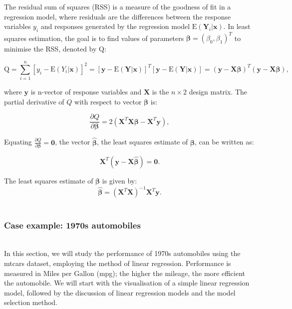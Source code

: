 \documentclass{article}\usepackage[]{graphicx}\usepackage[]{xcolor}
\numberwithin{equation}{section}
\begin{document}
\noindent The residual sum of squares (RSS) is a measure of the goodness of fit in a regression model, where residuals are the differences between the response variables $y_i$ and responses generated by the regression model $\mathrm{E}(\mathbf{Y}_i | \mathbf{x})$. In least squares estimation, the goal is to find values of parameters $\boldsymbol{\beta} = (\beta_0, \beta_1)^T$ to minimise the RSS, denoted by $\mathrm{Q}$: 

\begin{equation}\label{eq:4-3}
\mathrm{Q} = \sum_{i=1}^{n} [y_i - \mathrm{E} (Y_i | \mathbf{x})]^2 
           = [\mathbf{y}- \mathrm{E} (\mathbf{Y} | \mathbf{x})]^{T} [\mathbf{y}- \mathrm{E} (\mathbf{Y} | \mathbf{x})] 
           = (\mathbf{y}- \mathbf{X} \boldsymbol{\beta})^{T} (\mathbf{y}- \mathbf{X} \boldsymbol{\beta}),
\end{equation}

\noindent
where $\mathbf{y}$ is n-vector of response variables and $\mathbf{X}$ is the $n \times 2$ design matrix. The partial derivative of $Q$ with respect to vector $\boldsymbol{\beta}$ is:

\begin{equation}\label{eq:4-4}
\frac{\partial Q}{\partial \boldsymbol{\beta}} = 2(\mathbf{X}^T\mathbf{X} \boldsymbol{\beta} - \mathbf{X}^T\mathbf{y}),
\end{equation}

\noindent
Equating $\frac{\partial Q}{\partial \boldsymbol{\beta}} = \mathbf{0}$, the vector $\hat{\boldsymbol{\beta}}$, the least squares estimate of $\boldsymbol{\beta}$, can be written as:

\begin{equation}\label{eq:4-5}
\mathbf{X}^T(\mathbf{y}-\mathbf{X}\hat{\boldsymbol{\beta}})=\mathbf{0}.
\end{equation}

\noindent 
The least squares estimate of $\boldsymbol{\beta}$ is given by:
\begin{equation}\label{eq:4-6}
\hat{\boldsymbol{\beta}} = (\mathbf{X}^T\mathbf{X})^{-1}\mathbf{X}^T\mathbf{y}.
\end{equation}
\\ 
\noident 
\subsubsection{Case example: 1970s automobiles}\\
\noindent In this section, we will study the performance of 1970s automobiles using the mtcars dataset, employing the method of linear regression. Performance is measured in Miles per Gallon (mpg); the higher the mileage, the more efficient the automobile. We will start with the visualisation of a simple linear regression model, followed by the discussion of linear regression models and the model selection method.
\end{document}
